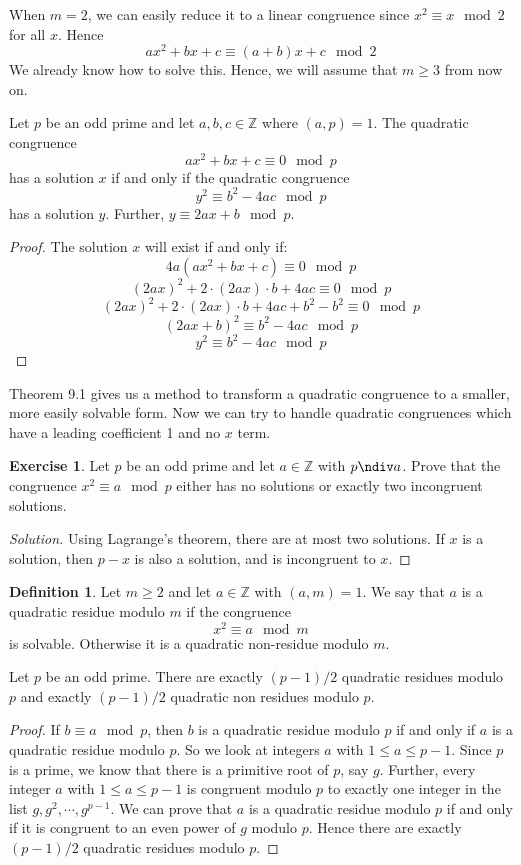 \documentclass[12pt,letterpaper]{book}
\theoremstyle{definition}
\newtheorem{definition}{Definition} %
\newtheorem*{exercise}{Exercise}
\newenvironment{solution}
  {\renewcommand\qedsymbol{$\blacksquare$}\begin{proof}[Solution]}
  {\end{proof}}
\newcommand{\Z}{\mathbb{Z}}
\begin{document}
When $m=2$, we can easily reduce it to a linear congruence since $x^2 \equiv x \mod 2$ for all $x$. Hence
\[ax^2 + bx + c \equiv (a+b)x + c \mod 2\]
We already know how to solve this. Hence, we will assume that $m \geq 3$ from now on.

\begin{theorem}
Let $p$ be an odd prime and let $a,b,c \in \Z$ where $(a,p) = 1$. The quadratic congruence
\[ax^2 + bx + c \equiv 0 \mod p\]
has a solution $x$ if and only if the quadratic congruence
\[y^2 \equiv b^2 - 4ac \mod p\]
has a solution $y$. Further, $y \equiv 2ax + b \mod p$.
\end{theorem}
\begin{proof}
  The solution $x$ will exist if and only if:
  \[4a(ax^2 + bx + c) \equiv 0 \mod p\] 
  \[(2ax)^2 + 2 \cdot (2ax) \cdot b + 4ac \equiv 0 \mod p\]
  \[(2ax)^2 + 2 \cdot (2ax) \cdot b + 4ac + b^2 - b^2 \equiv 0 \mod p\]
  \[(2ax + b)^2 \equiv b^2-4ac \mod p\]
  \[y^2 \equiv b^2 - 4ac \mod p\]
\end{proof}
Theorem 9.1 gives us a method to transform a quadratic congruence to a smaller, more easily solvable form. Now we can try to handle quadratic congruences which have a leading coefficient 1 and no $x$ term.

\begin{exercise}
  Let $p$ be an odd prime and let $a \in \Z$ with $p \ndiv a$. Prove that the congruence $x^2 \equiv a \mod p$ either has no solutions or exactly two incongruent solutions. 
\end{exercise}
\begin{solution}
  Using Lagrange's theorem, there are at most two solutions. If $x$ is a solution, then $p-x$ is also a solution, and is incongruent to $x$. 
\end{solution}

\begin{definition}
  Let $m \geq 2$ and let $a \in \Z$ with $(a,m) = 1$. We say that $a$ is a quadratic residue modulo $m$ if the congruence
  \[x^2 \equiv a \mod m\]
  is solvable. Otherwise it is a quadratic non-residue modulo $m$.
\end{definition}

\begin{theorem}
  Let $p$ be an odd prime. There are exactly $(p-1)/2$ quadratic residues modulo $p$ and exactly $(p-1)/2$ quadratic non residues modulo $p$. 
\end{theorem}
\begin{proof}
  If $b \equiv a \mod p$, then $b$ is a quadratic residue modulo $p$ if and only if $a$ is a quadratic residue modulo $p$. So we look at integers $a$ with $1 \leq a \leq p-1$. Since $p$ is a prime, we know that there is a primitive root of $p$, say $g$. Further, every integer $a$ with $1 \leq a \leq p-1$ is congruent modulo $p$ to exactly one integer in the list $g,g^2,\cdots, g^{p-1}$. We can prove that $a$ is a quadratic residue modulo $p$ if and only if it is congruent to an even power of $g$ modulo $p$. Hence there are exactly $(p-1)/2$ quadratic residues modulo $p$. 
\end{proof}
\end{document}

